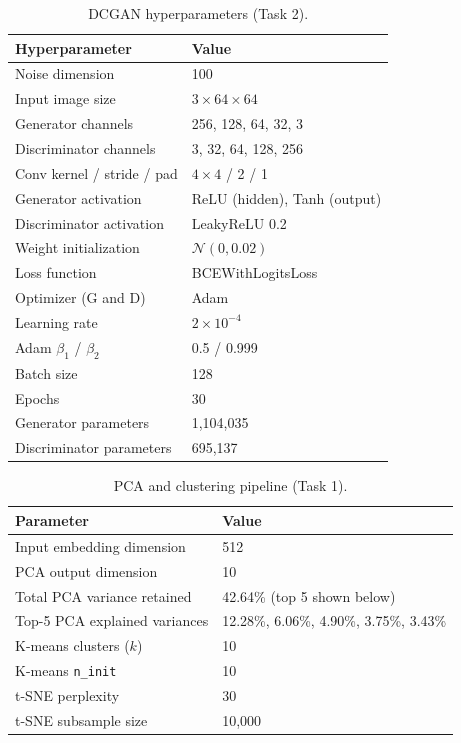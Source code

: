 \documentclass[12pt]{article}
\begin{document}
\begin{table}[h]
    \centering
    \caption{DCGAN hyperparameters (Task 2).}
    \begin{tabular}{ll}
        \toprule
        \textbf{Hyperparameter} & \textbf{Value} \\
        \midrule
        Noise dimension                  & 100 \\
        Input image size                 & $3 \times 64 \times 64$ \\
        Generator channels               & 256, 128, 64, 32, 3 \\
        Discriminator channels           & 3, 32, 64, 128, 256 \\
        Conv kernel / stride / pad       & $4\times4$ / 2 / 1 \\
        Generator activation             & ReLU (hidden), Tanh (output) \\
        Discriminator activation         & LeakyReLU 0.2 \\
        Weight initialization            & $\mathcal{N}(0, 0.02)$ \\
        Loss function                    & BCEWithLogitsLoss \\
        Optimizer (G and D)              & Adam \\
        Learning rate                    & $2\times10^{-4}$ \\
        Adam $\beta_1$ / $\beta_2$       & 0.5 / 0.999 \\
        Batch size                       & 128 \\
        Epochs                           & 30 \\
        Generator parameters             & 1,104,035 \\
        Discriminator parameters         & 695,137 \\
        \bottomrule
    \end{tabular}
\end{table}

\begin{table}[h]
    \centering
    \caption{PCA and clustering pipeline (Task 1).}
    \begin{tabular}{ll}
        \toprule
        \textbf{Parameter} & \textbf{Value} \\
        \midrule
        Input embedding dimension      & 512 \\
        PCA output dimension           & 10 \\
        Total PCA variance retained    & 42.64\% (top 5 shown below) \\
        Top-5 PCA explained variances  & 12.28\%, 6.06\%, 4.90\%, 3.75\%, 3.43\% \\
        K-means clusters ($k$)         & 10 \\
        K-means \texttt{n\_init}       & 10 \\
        t-SNE perplexity               & 30 \\
        t-SNE subsample size           & 10,000 \\
        \bottomrule
    \end{tabular}
\end{table}
\end{document}

